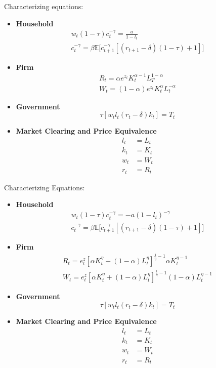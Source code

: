 \documentclass[12pt]{article}
\newenvironment{problem}[2][Problem]{\begin{trivlist}
\item[\hskip \labelsep {\bfseries #1}\hskip \labelsep {\bfseries #2.}]}{\end{trivlist}}
\theoremstyle{definition}
\theoremstyle{definition}
\theoremstyle{definition}
\theoremstyle{definition}
\begin{document}
\begin{problem}{3}
Characterizing equations:
\begin{itemize}
\item \textbf{Household}
\begin{align}
w_t(1-\tau)c_t^{-\gamma} = \frac{a}{1-l_t} \\
c_t^{-\gamma} = \beta \mathbb{E} \big[ c_{t+1}^{-\gamma}[(r_{t+1}-\delta)(1-\tau) +1] \big]
\end{align}

\item \textbf{Firm}
\begin{align}
R_t = \alpha e^{z_t} K_t^{\alpha - 1} L_T^{1-\alpha} \\
W_t = (1 - \alpha) e^{z_t} K_t^\alpha L_t^{-\alpha}
\end{align}
\item \textbf{Government}
\begin{equation}
\tau[w_tl_t(r_t - \delta)k_t] = T_t
\end{equation}
\item \textbf{Market Clearing and Price Equivalence}
\begin{align}
l_t &= L_t \\
k_t &= K_t \\
w_t &= W_t \\
r_t &= R_t 
\end{align}
\end{itemize}
\end{problem}
\begin{problem}{4}
Characterizing Equations:
\begin{itemize}
\item \textbf{Household}
\begin{align}
w_t(1-\tau)c_t^{-\gamma} = -a(1-l_t)^{-\gamma} \\
c_t^{-\gamma} = \beta \mathbb{E} \big[ c_{t+1}^{-\gamma}[(r_{t+1}-\delta)(1-\tau) +1] \big]
\end{align}

\item \textbf{Firm}
\begin{align}
R_t = e^z_t [\alpha K^{\eta}_t +(1-\alpha)L^{\eta}_t]^{\frac{1}{\eta} - 1} \alpha K_t^{\eta -1} \\
W_t = e^z_t [\alpha K^{\eta}_t +(1-\alpha)L^{\eta}_t]^{\frac{1}{\eta} - 1} (1-\alpha) L_t^{\eta -1}
\end{align}
\item \textbf{Government}
\begin{equation}
\tau[w_tl_t(r_t - \delta)k_t] = T_t
\end{equation}
\item \textbf{Market Clearing and Price Equivalence}
\begin{align}
l_t &= L_t \\
k_t &= K_t \\
w_t &= W_t \\
r_t &= R_t 
\end{align}
\end{itemize}
\end{problem}
\end{document}
